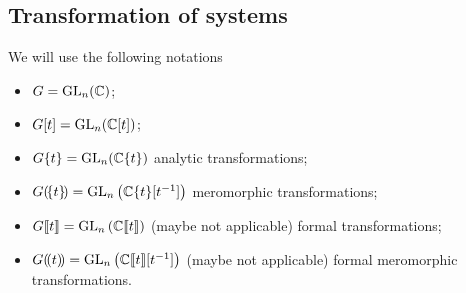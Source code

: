 \subsection{Transformation of systems}
\begin{comment}\footnotesize
  see \cite{thboalch} \textbf{Rem 1.41 on p. 16}:
  \begin{rem}
    Note that in most of the recent references we have used, Stokes matrices
    are used to classify
    \begin{itemize}
      \item meromorphic connections within fixed \textbf{formal meromorphic
        classes, modulo meromorphic equivalence}.
    \end{itemize}
    Whereas here we classify
    \begin{itemize}
      \item meromorphic connections within fixed \textbf{formal analytic
        classes, modulo analytic equivalence},
    \end{itemize}
    as is done in the older literature.  The fact is that the sets equivalence
    classes are the same in both cases. \comm{It is important for us to work
      with analytic, rather than meromorphic gauge transformations, because
    then the $\C^\infty$ viewpoint in Chapter 3 is cleaner.} This distinction
    relates to the difference between \textbf{‘regular singular’} connections
    and \textbf{‘logarithmic’} connections.
  \end{rem}
\end{comment}
\begin{notations}
  We will use the following notations
  \begin{itemize}
    \item $G=\operatorname{GL}_n(\mathbb{C})$;
    \item $G[t]=\operatorname{GL}_n(\mathbb{C}[t])$;
    \item $G\{t\}=\operatorname{GL}_n(\mathbb{C}\{t\})$ analytic transformations;
    \item $G(\!\{t\}\!)=\operatorname{GL}_n\left(\mathbb{C}\{t\}[t^{-1}]\right)$ meromorphic
      transformations;
    \item $G\llbracket t\rrbracket=\operatorname{GL}_n\left(\mathbb{C}\llbracket t\rrbracket\right)$
      (maybe not applicable) formal transformations;
    \item $G(\!(t)\!)=\operatorname{GL}_n\left(\mathbb{C}\llbracket t\rrbracket[t^{-1}]\right)$
      (maybe not applicable) formal meromorphic transformations.
  \end{itemize}
  \begin{comment}
    We will always use the meromorphic ones, in contrast
    to~\cite{boalch,thboalch} where analytic classification is used.
  \end{comment}
\end{notations}

